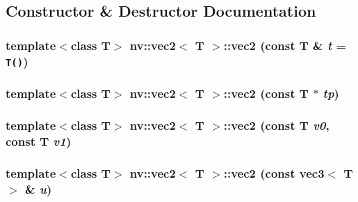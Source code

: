 \subsection{Constructor \& Destructor Documentation}
\hypertarget{classnv_1_1vec2_a7fc58dbc70f7868151241a774e9a373}{
\subsubsection[{vec2}]{\setlength{\rightskip}{0pt plus 5cm}template$<$class T$>$ {\bf nv::vec2}$<$ T $>$::{\bf vec2} (const T \& {\em t} = {\tt T()})}}
\label{classnv_1_1vec2_a7fc58dbc70f7868151241a774e9a373}


\hypertarget{classnv_1_1vec2_c7e7e13b6cd5d421b26d6bec20102a7a}{
\subsubsection[{vec2}]{\setlength{\rightskip}{0pt plus 5cm}template$<$class T$>$ {\bf nv::vec2}$<$ T $>$::{\bf vec2} (const T $\ast$ {\em tp})}}
\label{classnv_1_1vec2_c7e7e13b6cd5d421b26d6bec20102a7a}


\hypertarget{classnv_1_1vec2_a78e02de943252a1404231965f4c40c0}{
\subsubsection[{vec2}]{\setlength{\rightskip}{0pt plus 5cm}template$<$class T$>$ {\bf nv::vec2}$<$ T $>$::{\bf vec2} (const T {\em v0}, \/  const T {\em v1})}}
\label{classnv_1_1vec2_a78e02de943252a1404231965f4c40c0}


\hypertarget{classnv_1_1vec2_3c6b381a695bb5a78c1994ced890125b}{
\subsubsection[{vec2}]{\setlength{\rightskip}{0pt plus 5cm}template$<$class T$>$ {\bf nv::vec2}$<$ T $>$::{\bf vec2} (const {\bf vec3}$<$ T $>$ \& {\em u})}}
\label{classnv_1_1vec2_3c6b381a695bb5a78c1994ced890125b}


